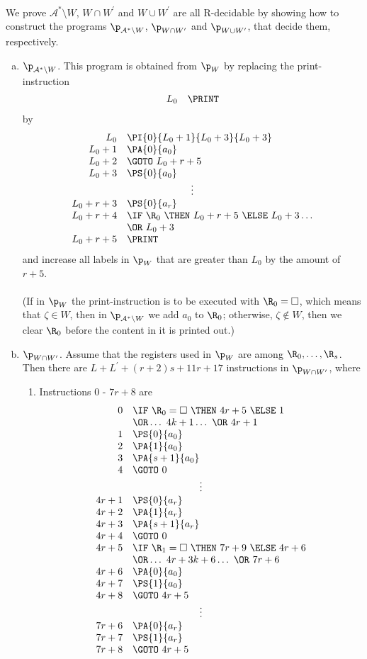 \begin{enumerate}[1.]
\ \\
We prove $\mathcal{A}^\ast \setminus W$, $W \cap W^\prime$ and $W \cup W^\prime$ are all R-decidable by showing how to construct the programs $\p_{\mathcal{A}^\ast \setminus W}$, $\p_{W \cap W^\prime}$ and $\p_{W \cup W^\prime}$, that decide them, respectively.
\begin{enumerate}[(a)]
\item $\p_{\mathcal{A}^\ast \setminus W}$. This program is obtained from $\p_W$ by replacing the print-instruction
\[
\begin{array}{rl}
L_0 & \PRINT
\end{array}
\]
by
\[
\begin{array}{rl}
L_0 & \PI{0}{L_0 + 1}{L_0 + 3}{L_0 + 3} \cr
L_0 + 1 & \PA{0}{a_0} \cr
L_0 + 2 & \GOTO \ L_0 + r + 5 \cr
L_0 + 3 & \PS{0}{a_0} \cr
\multicolumn{2}{c}{\vdots} \cr
L_0 + r + 3 & \PS{0}{a_r} \cr
L_0 + r + 4 & \IF \ \R_0 \ \THEN \ L_0 + r + 5 \ \ELSE \ L_0 + 3 \ldots \cr
\ & \OR \ L_0 + 3 \cr
L_0 + r + 5 & \PRINT
\end{array}
\]
and increase all labels in $\p_W$ that are greater than $L_0$ by the amount of $r + 5$.\\
\ \\
(If in $\p_W$ the print-instruction is to be executed with $\R_0 = \Box$, which means that $\zeta \in W$, then in $\p_{\mathcal{A}^\ast \setminus W}$ we add $a_0$ to $\R_0$; otherwise, $\zeta \not\in W$, then we clear $\R_0$ before the content in it is printed out.)
\item $\p_{W \cap W^\prime}$. Assume that the registers used in $\p_W$ are among $\R_0, \ldots, \R_s$. Then there are $L + L^\prime + (r + 2)s + 11r + 17$ instructions in $\p_{W \cap W^\prime}$, where
\begin{enumerate}[(1)]
\item Instructions $0$ - $7r + 8$ are
\[
\begin{array}{rl}
0 & \IF \ \R_0 = \Box \ \THEN \ 4r + 5 \ \ELSE \ 1 \cr
\ & \OR \ldots \ 4k + 1 \ldots \ \OR \ 4r + 1 \cr
1 & \PS{0}{a_0} \cr
2 & \PA{1}{a_0} \cr
3 & \PA{s + 1}{a_0} \cr
4 & \GOTO \ 0 \cr
\multicolumn{2}{c}{\vdots} \cr
4r + 1 & \PS{0}{a_r} \cr
4r + 2 & \PA{1}{a_r} \cr
4r + 3 & \PA{s + 1}{a_r} \cr
4r + 4 & \GOTO \ 0 \cr
4r + 5 & \IF \ \R_1 = \Box \ \THEN \ 7r + 9 \ \ELSE \ 4r + 6 \cr
\ & \OR \ldots \ 4r + 3k + 6 \ldots \ \OR \ 7r + 6 \cr
4r + 6 & \PA{0}{a_0} \cr
4r + 7 & \PS{1}{a_0} \cr
4r + 8 & \GOTO \ 4r + 5 \cr
\multicolumn{2}{c}{\vdots} \cr
7r + 6 & \PA{0}{a_r} \cr
7r + 7 & \PS{1}{a_r} \cr
7r + 8 & \GOTO \ 4r + 5 \cr
\end{array}
\]
\end{enumerate}
\end{enumerate}
\end{enumerate}
